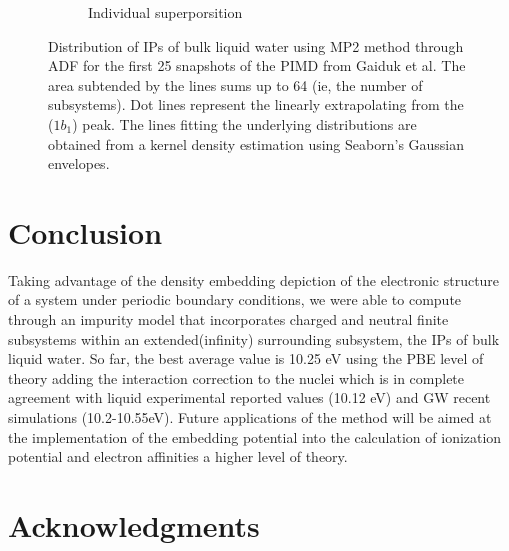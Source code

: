 \documentclass[12pt,a4paper]{article}
\begin{document}
\begin{figure}[!ht]
\begin{subfigure}{0.4\linewidth}
                \caption{Individual superporsition}
        \end{subfigure}
	\caption{Distribution of IPs of bulk liquid water using MP2 method through ADF \cite{te2001chemistry} for the first 25 snapshots of the PIMD from Gaiduk et al. The area subtended by the lines sums up to 64 (ie, the number of subsystems). Dot lines represent the linearly extrapolating from the ($1b_{1}$) peak. The lines fitting the underlying distributions are obtained from a kernel density estimation using Seaborn's Gaussian envelopes\cite{waskom2017c}.}
\end{figure}

\section{Conclusion}

Taking advantage of the density embedding depiction of the electronic structure of a system under periodic boundary conditions, we were able to 
compute through an impurity model that incorporates charged and neutral finite subsystems within an extended(infinity) surrounding subsystem, 
the IPs of bulk liquid water. So far, the best average value is 10.25 eV using the PBE level of theory adding the interaction correction to the 
nuclei which is in complete agreement with liquid experimental reported values (10.12 eV) and GW recent simulations (10.2-10.55eV). 
Future applications of the method will be aimed at the implementation of the embedding potential into the calculation of ionization potential
and electron affinities a higher level of theory. \\

\nocite{*}

\printbibliography

\section{Acknowledgments}
\end{document}
